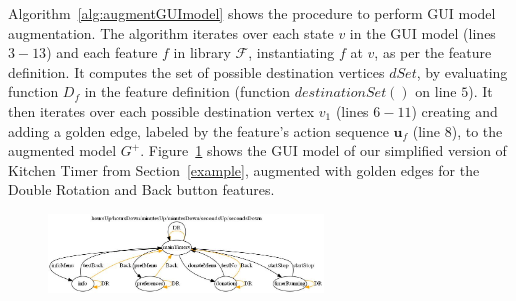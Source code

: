 Algorithm~\ref{alg:augmentGUImodel} shows the procedure to perform GUI model augmentation. The algorithm iterates over each state $v$ in the GUI model (lines $3-13$) and each feature $f$ in library $\mathcal{F}$, instantiating $f$ at $v$, as per the feature definition. It computes the set of possible destination vertices $dSet$, by evaluating function $D_f$ in the feature definition (function $\mathit{destinationSet()}$ on line $5$). It then iterates over each possible destination vertex $v_1$ (lines $6-11$) creating and adding a golden edge, labeled by the feature's action sequence $\mathbf{u}_f$ (line $8$), to the augmented model $G^+$.
Figure~\ref{fig:dotGraph} shows the GUI model of our simplified version of Kitchen Timer from Section~\ref{example}, augmented with golden edges for the Double Rotation and Back button features.

\begin{figure}[!t]
\centering
\includegraphics[width=0.65\textwidth]{figures/dotGraph.jpg}
\label{fig:dotGraph}
\end{figure}
